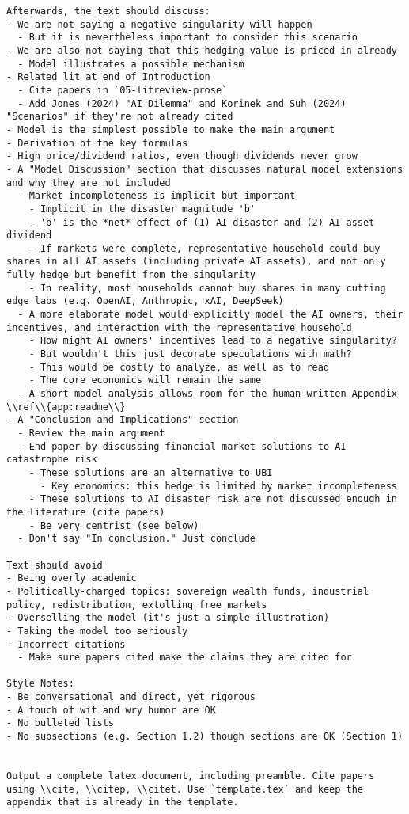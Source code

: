 \begin{lstlisting}[language=text,breaklines=true,frame=single]
Afterwards, the text should discuss:      
- We are not saying a negative singularity will happen
  - But it is nevertheless important to consider this scenario        
- We are also not saying that this hedging value is priced in already
  - Model illustrates a possible mechanism
- Related lit at end of Introduction
  - Cite papers in `05-litreview-prose`
  - Add Jones (2024) "AI Dilemma" and Korinek and Suh (2024) "Scenarios" if they're not already cited
- Model is the simplest possible to make the main argument
- Derivation of the key formulas
- High price/dividend ratios, even though dividends never grow
- A "Model Discussion" section that discusses natural model extensions and why they are not included
  - Market incompleteness is implicit but important
    - Implicit in the disaster magnitude 'b'
    - 'b' is the *net* effect of (1) AI disaster and (2) AI asset dividend
    - If markets were complete, representative household could buy shares in all AI assets (including private AI assets), and not only fully hedge but benefit from the singularity 
    - In reality, most households cannot buy shares in many cutting edge labs (e.g. OpenAI, Anthropic, xAI, DeepSeek)
  - A more elaborate model would explicitly model the AI owners, their incentives, and interaction with the representative household
    - How might AI owners' incentives lead to a negative singularity?        
    - But wouldn't this just decorate speculations with math?          
    - This would be costly to analyze, as well as to read
    - The core economics will remain the same 
  - A short model analysis allows room for the human-written Appendix \\ref\\{app:readme\\}
- A "Conclusion and Implications" section 
  - Review the main argument
  - End paper by discussing financial market solutions to AI catastrophe risk
    - These solutions are an alternative to UBI
      - Key economics: this hedge is limited by market incompleteness
    - These solutions to AI disaster risk are not discussed enough in the literature (cite papers)
    - Be very centrist (see below)
  - Don't say "In conclusion." Just conclude          

Text should avoid      
- Being overly academic
- Politically-charged topics: sovereign wealth funds, industrial policy, redistribution, extolling free markets
- Overselling the model (it's just a simple illustration)
- Taking the model too seriously
- Incorrect citations
  - Make sure papers cited make the claims they are cited for

Style Notes:
- Be conversational and direct, yet rigorous
- A touch of wit and wry humor are OK
- No bulleted lists
- No subsections (e.g. Section 1.2) though sections are OK (Section 1)


Output a complete latex document, including preamble. Cite papers using \\cite, \\citep, \\citet. Use `template.tex` and keep the appendix that is already in the template.

\end{lstlisting}
\vspace{-3ex}